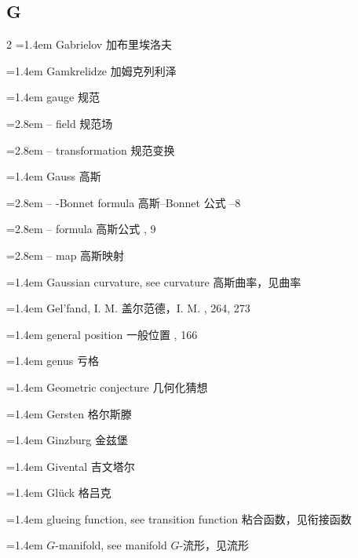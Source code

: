 \subsection*{G}
\small
\begin{multicols}{2}
\noindent\hangindent=1.4em Gabrielov \quad 加布里埃洛夫 \par
\noindent\hangindent=1.4em Gamkrelidze \quad 加姆克列利泽 \par
\noindent\hangindent=1.4em gauge \quad 规范 \quad\par
\noindent\hangindent=2.8em -- field \quad 规范场 \par
\noindent\hangindent=2.8em -- transformation \quad 规范变换 \par
\noindent\hangindent=1.4em Gauss \quad 高斯 \quad\par
\noindent\hangindent=2.8em -- -Bonnet formula \quad 高斯--Bonnet 公式 --8\par
\noindent\hangindent=2.8em -- formula \quad 高斯公式 , 9\par
\noindent\hangindent=2.8em -- map \quad 高斯映射 \par
\noindent\hangindent=1.4em Gaussian curvature, see curvature \quad 高斯曲率，见曲率 \quad\par
\noindent\hangindent=1.4em Gel'fand, I. M. \quad 盖尔范德，I. M. , 264, 273\par
\noindent\hangindent=1.4em general position \quad 一般位置 , 166\par
\noindent\hangindent=1.4em genus \quad 亏格 \par
\noindent\hangindent=1.4em Geometric conjecture \quad 几何化猜想 \par
\noindent\hangindent=1.4em Gersten \quad 格尔斯滕 \par
\noindent\hangindent=1.4em Ginzburg \quad 金兹堡 \par
\noindent\hangindent=1.4em Givental \quad 吉文塔尔 \par
\noindent\hangindent=1.4em Gl\"uck \quad 格吕克 \par
\noindent\hangindent=1.4em glueing function, see transition function \quad 粘合函数，见衔接函数 \quad\par
\noindent\hangindent=1.4em $G$-manifold, see manifold \quad $G$-流形，见流形 \quad\par

\end{multicols}
